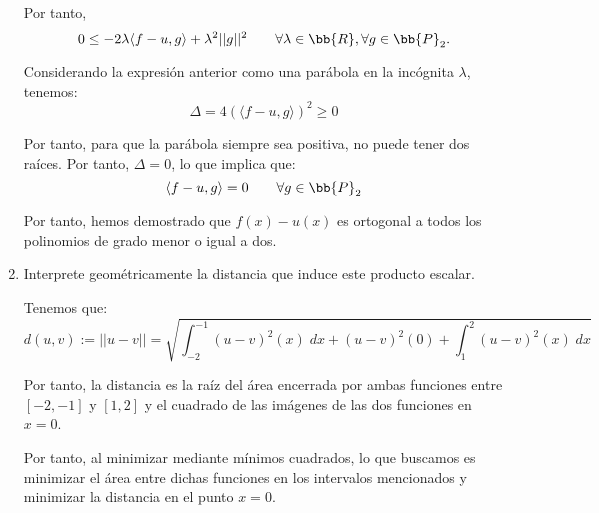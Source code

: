 \begin{ejercicio}
\begin{enumerate}
        Por tanto,
        \begin{equation*}
            0 \leq -2\lambda \langle f-u,g\rangle +\lambda^2 ||g||^2
            \qquad \forall \lambda\in \bb{R}, \forall g\in \bb{P}_2.
        \end{equation*}

        Considerando la expresión anterior como una parábola en la incógnita $\lambda$, tenemos:
        \begin{equation*}
            \Delta = 4(\langle f-u,g\rangle)^2 \geq 0
        \end{equation*}

        Por tanto, para que la parábola siempre sea positiva, no puede tener dos raíces. Por tanto, $\Delta=0$, lo que implica que:
        \begin{equation*}
            \langle f-u,g\rangle = 0 \qquad \forall g\in \bb{P}_2
        \end{equation*}

        Por tanto, hemos demostrado que $f(x) - u(x)$ es ortogonal a todos los polinomios de grado menor o igual a dos.
        
        \item Interprete geométricamente la distancia que induce este producto escalar.

        Tenemos que:
        \begin{equation*}
            d(u,v) := ||u-v||
            = \sqrt{\int_{-2}^{-1}(u-v)^2(x)\;dx + (u-v)^2(0) + \int_{1}^{2}(u-v)^2(x)\;dx}
        \end{equation*}

        Por tanto, la distancia es la raíz del área encerrada por ambas funciones entre $[-2, -1]$ y $[1,2]$ y el cuadrado de las imágenes de las dos funciones en $x=0$.

        Por tanto, al minimizar mediante mínimos cuadrados, lo que buscamos es minimizar el área entre dichas funciones en los intervalos mencionados y minimizar la distancia en el punto $x=0$.
        
        
        

        
    \end{enumerate}
\end{ejercicio}

